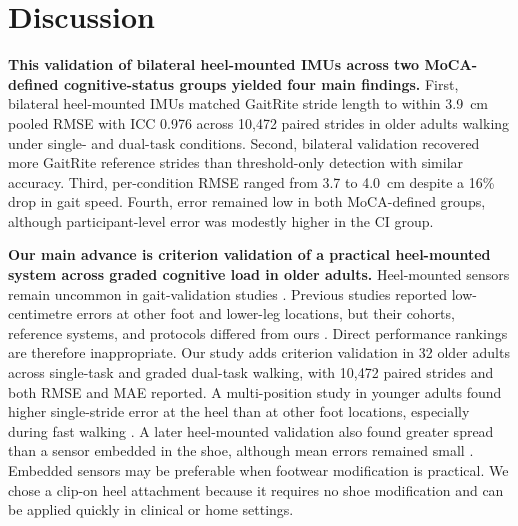 \documentclass[fleqn,10pt,lineno]{wlpeerj}
\begin{document}

\clearpage
\section{Discussion}

\textbf{This validation of bilateral heel-mounted IMUs across two MoCA-defined cognitive-status groups yielded four main findings.}
First, bilateral heel-mounted IMUs matched GaitRite stride length to within 3.9~cm pooled RMSE with ICC 0.976 across 10{,}472 paired strides in older adults walking under single- and dual-task conditions. Second, bilateral validation recovered more GaitRite reference strides than threshold-only detection with similar accuracy. Third, per-condition RMSE ranged from 3.7 to 4.0~cm despite a 16\% drop in gait speed. Fourth, error remained low in both MoCA-defined groups, although participant-level error was modestly higher in the CI group.

\textbf{Our main advance is criterion validation of a practical heel-mounted system across graded cognitive load in older adults.} Heel-mounted sensors remain uncommon in gait-validation studies \citep{Lin2025, Kuderle2022}. Previous studies reported low-centimetre errors at other foot and lower-leg locations, but their cohorts, reference systems, and protocols differed from ours \citep{Mariani2010, Trojaniello2014, Laidig2021, Rampp2015}. Direct performance rankings are therefore inappropriate. Our study adds criterion validation in 32 older adults across single-task and graded dual-task walking, with 10{,}472 paired strides and both RMSE and MAE reported. A multi-position study in younger adults found higher single-stride error at the heel than at other foot locations, especially during fast walking \citep{Kuderle2022}. A later heel-mounted validation also found greater spread than a sensor embedded in the shoe, although mean errors remained small \citep{Luo2024}. Embedded sensors may be preferable when footwear modification is practical. We chose a clip-on heel attachment because it requires no shoe modification and can be applied quickly in clinical or home settings.
\end{document}
